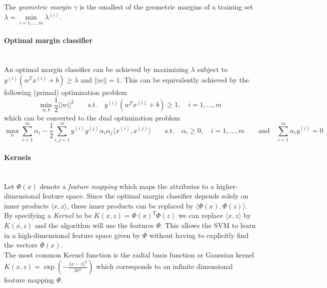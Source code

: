     The \emph{geometric margin} $\gamma$ is the smallest of the geometric margins of a training set $\lambda = \min\limits_{i=1,\ldots,m}\lambda^{(i)}$.
    
    \paragraph{Optimal margin classifier}~\\
    An optimal margin classifier can be achieved by maximizing $\lambda$ subject to $y^{(i)}(w^T x^{(i)}+b)\geq\lambda$ and $||w||=1$.
    This can be equivalently achieved by the following (primal) optimization problem
    \begin{equation*}
        \min_{w,b} \frac{1}{2} ||w||^2 \qquad \text{s.t.} \quad y^{(i)}(w^T x^{(i)} + b) \geq 1, \quad i=1,\ldots,m
    \end{equation*}
    which can be converted to the dual optimization problem
    \begin{equation*}
        \max_{\alpha} \sum\limits_{i=1}^m \alpha_i - \frac{1}{2}\sum\limits_{i,j=1}^m y^{(i)}y^{(j)}\alpha_i\alpha_j \langle x^{(i)},x^{(j)} \rangle
        \qquad \text{s.t.} \quad \alpha_i \geq 0, \quad i=1,\ldots,m \qquad \text{and} \quad \sum\limits_{i=1}^m \alpha_i y^{(i)}=0
    \end{equation*}
    
    \paragraph{Kernels}~\\
    Let $\Phi(x)$ denote a \emph{feature mapping} which maps the attributes to a higher-dimensional feature space.
    Since the optimal margin classifier depends solely on inner products $\langle x,z \rangle$, 
    these inner products can be replaced by $\langle \Phi(x),\Phi(z) \rangle$. 
    By specifying a \emph{Kernel} to be $K(x,z) = \Phi(x)^T \Phi(z)$ we can replace $\langle x,z \rangle$ by $K(x,z)$ and the algorithm will use the features $\Phi$.
    This allows the SVM to learn in a high-dimensional feature space given by $\Phi$ without having to explicitly find the vectors $\Phi(x)$. \\
    
    The most common Kernel function is the radial basis function or Gaussian kernel 
    $K(x,z) = \exp\left(-\frac{||x-z||^2}{2 \sigma^2}\right)$
    which corresponds to an infinite dimensional feature mapping $\Phi$.  \\
    
